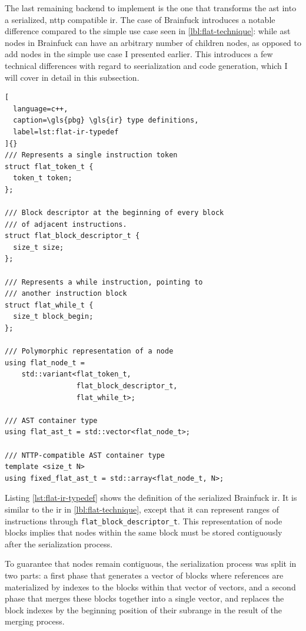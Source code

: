 \documentclass[../main]{subfiles}
\begin{document}
The last remaining backend to implement is the one that transforms
the \gls{ast} into a serialized, \gls{nttp} compatible \gls{ir}.
The case of Brainfuck introduces a notable difference compared to the simple
use case seen in \ref{lbl:flat-technique}: while \gls{ast} nodes in Brainfuck
can have an arbitrary number of children nodes, as opposed to add nodes in
the simple use case I presented earlier. This introduces a few technical
differences with regard to seerialization and code generation, which I will
cover in detail in this subsection.

\begin{lstlisting}[
  language=c++,
  caption=\gls{pbg} \gls{ir} type definitions,
  label=lst:flat-ir-typedef
]{}
/// Represents a single instruction token
struct flat_token_t {
  token_t token;
};

/// Block descriptor at the beginning of every block
/// of adjacent instructions.
struct flat_block_descriptor_t {
  size_t size;
};

/// Represents a while instruction, pointing to
/// another instruction block
struct flat_while_t {
  size_t block_begin;
};

/// Polymorphic representation of a node
using flat_node_t =
    std::variant<flat_token_t,
                 flat_block_descriptor_t,
                 flat_while_t>;

/// AST container type
using flat_ast_t = std::vector<flat_node_t>;

/// NTTP-compatible AST container type
template <size_t N>
using fixed_flat_ast_t = std::array<flat_node_t, N>;
\end{lstlisting}

Listing \ref{lst:flat-ir-typedef} shows the definition of the serialized
Brainfuck \gls{ir}. It is similar to the \gls{ir} in \ref{lbl:flat-technique},
except that it can represent ranges of instructions through
\lstinline{flat_block_descriptor_t}. This representation of node blocks
implies that nodes within the same block must be stored contiguously
after the serialization process.

To guarantee that nodes remain contiguous, the serialization process was split
in two parts: a first phase that generates a vector of blocks where references
are materialized by indexes to the blocks within that vector of vectors,
and a second phase that merges these blocks together into a single vector,
and replaces the block indexes by the beginning position of their subrange
in the result of the merging process.
\end{document}
